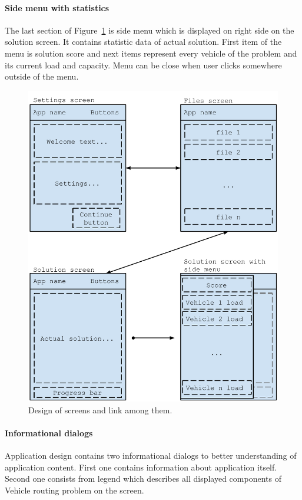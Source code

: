\paragraph{Side menu with statistics}
The last section of Figure~\ref{ScreenDesignFigure} is side menu which is displayed on right side on the solution
screen. It contains statistic data of actual solution. First item of the menu is solution score and next items represent
every vehicle of the problem and its current load and capacity. Menu can be close when user clicks somewhere outside
of the menu.

\begin{figure}[h!]
    \centering
    \includegraphics[scale=0.7]{fig/sceen_design.pdf}
    \caption{Design of screens and link among them.}
    \label{ScreenDesignFigure}
\end{figure}

\paragraph{Informational dialogs}
Application design contains two informational dialogs to better understanding of application content. First one contains
information about application itself. Second one consists from legend which describes all displayed components of
Vehicle routing problem on the screen.

